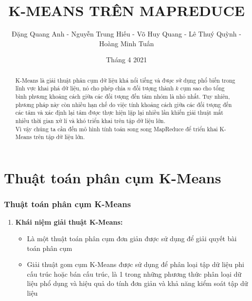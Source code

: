 \documentclass[12pt]{beamer}
\begin{document}
	\author{Đặng Quang Anh - Nguyễn Trung Hiếu - Võ Huy Quang - Lê Thuý Quỳnh - Hoàng Minh Tuấn}
	\title{K-MEANS TRÊN MAPREDUCE}
	\date{Tháng 4 2021}
	\maketitle
	\begin{abstract}
		K-Means là giải thuật phân cụm dữ liệu khá nổi tiếng và được sử dụng phổ biến trong lĩnh vực khai phá dữ liệu, nó cho phép chia $n$ đối tượng thành $k$ cụm sao cho tổng bình phương khoảng cách giữa các đối tượng đến tâm nhóm là nhỏ nhất. Tuy nhiên, phương pháp này còn nhiều hạn chế do việc tính khoảng cách giữa các đối tượng đến các tâm và xác định lại tâm được thực hiện lặp lại nhiều lần khiến giải thuật mất nhiều thời gian xử lí và khó triển khai trên tập dữ liệu lớn.\\
		Vì vậy chúng ta cần đến mô hình tính toán song song MapReduce để triển khai K-Means trên tập dữ liệu lớn.
	\end{abstract}


	\section{Thuật toán phân cụm K-Means}
	\begin{frame}
		\frametitle{Thuật toán phân cụm K-Means}
		\begin{enumerate} [\textbf{1.}]
			\item \textbf{Khái niệm giải thuật K-Means:}
					\begin{itemize}
						\item Là một thuật toán phân cụm đơn giản được sử dụng để giải quyết bài toán phân cụm
						\item Giải thuật gom cụm K-Means được sử dụng để phân loại tập dữ liệu phi cấu trúc hoặc bán cấu trúc, là 1 trong những phương thức phân loại dữ liệu phổ dụng và hiệu quả do tính đơn giản và khả năng kiểm soát tập dữ liệu
					\end{itemize}
		\end{enumerate}
	\end{frame}
	
\end{document}
